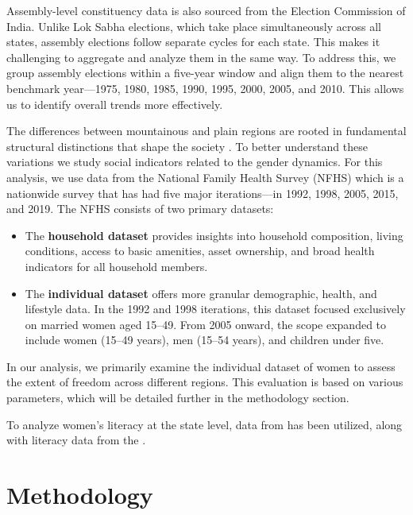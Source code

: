 \vspace{0.3cm}

Assembly-level constituency data is also sourced from the Election Commission of India. Unlike Lok Sabha elections, which take place simultaneously across all states, assembly elections follow separate cycles for each state. This makes it challenging to aggregate and analyze them in the same way. To address this, we group assembly elections within a five-year window and align them to the nearest benchmark year—1975, 1980, 1985, 1990, 1995, 2000, 2005, and 2010. This allows us to identify overall trends more effectively.

\vspace{0.3 cm}

The differences between mountainous and plain regions  are rooted in fundamental structural distinctions that shape the society \citep{jamesscott}. To better understand these variations we study social indicators related to the gender dynamics. For this analysis, we use data from the National Family Health Survey (NFHS) which is a  nationwide survey that has had five major iterations—in 1992, 1998, 2005, 2015, and 2019. The NFHS consists of two primary datasets: 

\begin{itemize}
    \item The \textbf{household dataset} provides insights into household composition, living conditions, access to basic amenities, asset ownership, and broad health indicators for all household members.
\item The \textbf{individual dataset} offers more granular demographic, health, and lifestyle data. In the 1992 and 1998 iterations, this dataset focused exclusively on married women aged 15–49. From 2005 onward, the scope expanded to include women (15–49 years), men (15–54 years), and children under five.
\end{itemize}

In our analysis, we primarily examine the individual dataset of women to assess the extent of freedom across different regions. This evaluation is based on various parameters, which will be detailed further in the methodology section.

\vspace{0.3 cm}

To analyze women's literacy at the state level, data from \cite{census1991,census2001,census2011} has been utilized, along with literacy data from the \cite{NSC2017}.

\section{Methodology}
